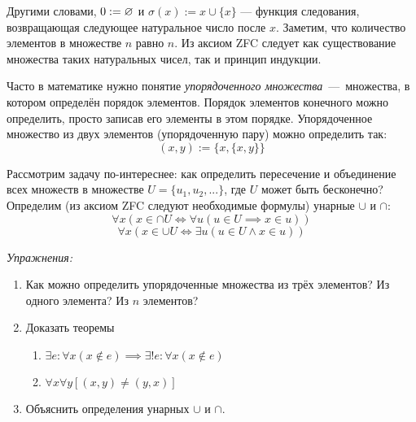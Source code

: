 Другими словами, ${0:=\varnothing}$ и $\sigma(x):=x\cup \{x\}$ --- функция следования,
возвращающая следующее натуральное число после $x$. Заметим, что количество элементов
в множестве $n$ равно $n$. Из аксиом ZFC следует как существование множества таких
натуральных чисел, так и принцип индукции.

Часто в математике нужно понятие {\it упорядоченного множества}~---~множества,
в котором определён порядок элементов. Порядок элементов конечного можно
определить, просто записав его элементы в этом порядке.
Упорядоченное множество из двух элементов (упорядоченную пару)
можно определить так:
\[
	(x,y):=\{x,\{x,y\}\}
\]

Рассмотрим задачу по-интереснее: как определить пересечение и объединение
всех множеств в множестве $U=\{u_1,u_2,...\}$, где $U$ может быть бесконечно?
Определим (из аксиом ZFC следуют необходимые формулы) унарные $\cup$ и $\cap$:
\[
	\forall x(x\in \cap U\iff \forall u(u\in U\implies x\in u))
\]
\[
	\forall x(x\in \cup U\iff \exists u(u\in U\land x\in u))
\]

\vspace{1em}
{\it Упражнения:}
\begin{enumerate}
	\item{}Как можно определить упорядоченные множества из трёх элементов?
	Из одного элемента? Из $n$ элементов?

	\item{}Доказать теоремы
	\begin{enumerate}
		\item{}${\exists e:\forall x(x\notin e)\implies
					\exists!e:\forall x(x\notin e)}$ \label{ex:eset_only}
		\item{}$\forall x\forall y[(x,y)\neq (y,x)]$
	\end{enumerate}
	\item{}Объяснить определения унарных $\cup$ и $\cap$.
\end{enumerate}

\pagebreak
